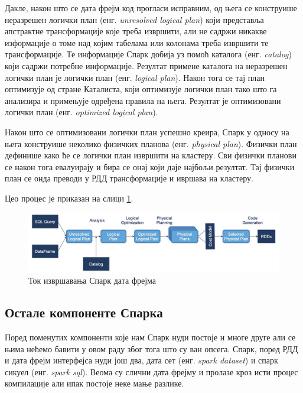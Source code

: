 \documentclass[12pt,oneside]{memoir}
\begin{document}
Дакле, након што се дата фрејм код прогласи исправним, од њега се конструише неразрешен логички план (енг. \textit{unresolved logical plan}) који представља апстрактне трансформације које треба извршити, али не садржи никакве изформације о томе над којим табелама или колонама треба извршити те трансформације. Те информације Спарк добија уз помоћ каталога (енг. \textit{catalog}) који садржи потребне информације. Резултат примене каталога на неразрешен логички план је логички план (енг. \textit{logical plan}). Након тога се тај план оптимизује од стране Каталиста, који оптимизује логички план тако што га анализира и примењује одређена правила на њега. Резултат је оптимизовани логички план (енг. \textit{optimized logical plan}). \cite{spark_guide}

Након што се оптимизовани логички план успешно креира, Спарк у односу на њега конструише неколико физичких планова (енг. \textit{physical plan}). Физички план дефинише како ће се логички план извршити на кластеру. Сви физички планови се након тога евалуирају и бира се онај који даје најбољи резултат. Тај физички план се онда преводи у РДД трансформације и ивршава на кластеру. \cite{spark_guide}

Цео процес је приказан на слици \ref{fig:sprk_ex_plns}.

\begin{figure}[!ht]
  \centering
  \includegraphics[width=1\textwidth]{pictures/spark_logical_plan.jpeg}
  \caption{Ток извршавања Спарк дата фрејма}
  \label{fig:sprk_ex_plns}
\end{figure}


\subsection{Остале компоненте Спарка}
\label{subsec:spark_components}

Поред поменутих компоненти које нам Спарк нуди постоје и многе друге али се њима нећемо бавити у овом раду због тога што су ван опсега. Спарк, поред РДД и дата фрејм интерфејса нуди још два, дата сет (енг. \textit{spark dataset}) и спарк сикуел (енг. \textit{spark sql}). Веома су слични дата фрејму и пролазе кроз исти процес компилације али ипак постоје неке мање разлике. \cite{spark_guide} 
\end{document}
